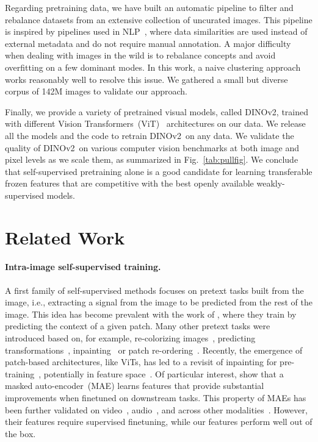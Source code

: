 Regarding pretraining data, we have built an automatic pipeline to filter and rebalance datasets from an extensive collection of uncurated images. This pipeline is inspired by pipelines used in NLP~\citep{wenzek2019ccnet}, where data similarities are used instead of external metadata and do not require manual annotation. A major difficulty when dealing with images in the wild is to rebalance concepts and avoid overfitting on a few dominant modes. In this work, a naive clustering approach works reasonably well to resolve this issue. We gathered a small but diverse corpus of 142M images to validate our approach.

Finally, we provide a variety of pretrained visual models, called DINOv2, trained with different Vision Transformers~(ViT)~\citep{dosovitskiy2016discriminative} architectures on our data. We release all the models and the code to retrain DINOv2~on any data. We validate the quality of DINOv2~on various computer vision benchmarks at both image and pixel levels as we scale them, as summarized in Fig.~\ref{tab:pullfig}.
We conclude that self-supervised pretraining alone is a good candidate for learning transferable frozen features that are competitive with the best openly available weakly-supervised models.

\section{Related Work}

\paragraph{Intra-image self-supervised training.} A first family of self-supervised methods focuses on pretext tasks built from the image, i.e., extracting a signal from the image to be predicted from the rest of the image. This idea has become prevalent with the work of \cite{doersch2015unsupervised}, where they train by predicting the context of a given patch. Many other pretext tasks were introduced based on, for example, re-colorizing images~\citep{zhang2016colorful}, predicting transformations~\citep{gidaris2018unsupervised}, inpainting~\citep{pathakCVPR16context} or patch re-ordering~\citep{noroozi2016jigsaw, misra2020self}. Recently, the emergence of patch-based architectures, like ViTs, has led to a revisit of inpainting for pre-training~\citep{he2021masked, bao2021beit, el2021large}, potentially in feature space~\citep{assran2023self, baevski2022data2vec}. Of particular interest, \cite{he2021masked} show that a masked auto-encoder~(MAE) learns features that provide substantial improvements when finetuned on downstream tasks. This property of MAEs has been further validated on video~\citep{tong2022videomae}, audio~\citep{xu2022masked}, and across other modalities~\citep{girdhar2022omnimae}. However, their features require supervised finetuning, while our features perform well out of the box.

